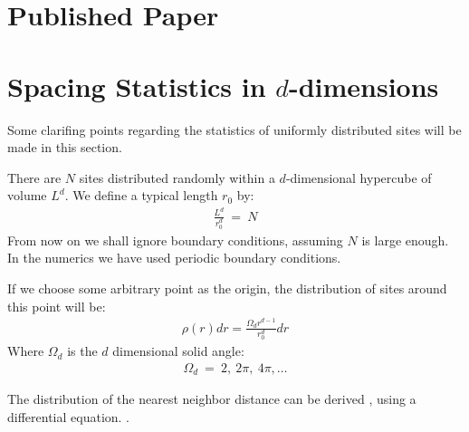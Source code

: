 \chapter{Published Paper}\label{sec:papers}


\chapter{Spacing Statistics in $d$-dimensions}\label{sec:spacing}

Some clarifing points regarding the statistics of uniformly distributed sites 
will be made in this section.


There are $N$ sites distributed randomly within a $d$-dimensional
hypercube of volume $L^d$. We define a typical length $r_0$ by:
%
\begin{align}
\frac{L^d}{r_0^d} \ =\ N
\end{align}
%
From now on we shall ignore boundary conditions, assuming $N$ is large enough.
In the numerics we have used periodic boundary conditions.


If we choose some arbitrary point as the origin, the distribution of sites
around this point will be:
%
\begin{align}\label{eq:rho}
\rho(r)dr = \frac{\Omega_d r^{d-1}}{r_0^d}dr
\end{align}
% 
Where $\Omega_d$ is the $d$ dimensional solid angle:
%
\begin{align}
\Omega_d \ =\ 2,\ 2\pi,\ 4\pi, \ldots
\end{align}
%

The distribution of the nearest neighbor distance can be 
derived \cite{hertz_uber_1909,*Chandrasekhar_stochastic_1943,*Torquato_nearest-neighbor_1990},
using a differential equation. 
. %

